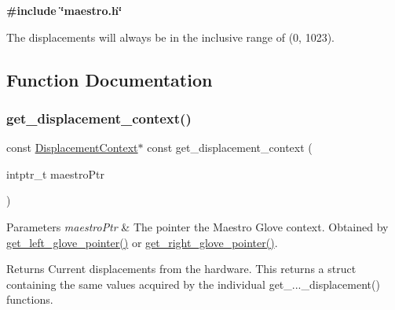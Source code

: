 {\bfseries {\ttfamily \#include \char`\"{}maestro.\+h\char`\"{}}}

The displacements will always be in the inclusive range of (0, 1023). 

\subsection{Function Documentation}
\mbox{\label{group__displacement_access_ga26563f1c104bd9a0d80ab8c0afd1e8bd}} 
\subsubsection{\texorpdfstring{get\+\_\+displacement\+\_\+context()}{get\_displacement\_context()}}
{\footnotesize\ttfamily const \hyperlink{struct_displacement_context}{Displacement\+Context}$\ast$ const get\+\_\+displacement\+\_\+context (\begin{DoxyParamCaption}\item[{intptr\+\_\+t}]{maestro\+Ptr }\end{DoxyParamCaption})}


\begin{DoxyParams}{Parameters}
{\em maestro\+Ptr} & The pointer the Maestro Glove context. Obtained by \hyperlink{group__glove_management_ga63ce3c99d4a8b8db851b22af9185764e}{get\+\_\+left\+\_\+glove\+\_\+pointer()} or \hyperlink{group__glove_management_ga9b8fd9d91aeac3f8da50f7a7eba0c32b}{get\+\_\+right\+\_\+glove\+\_\+pointer()}. \\
\hline
\end{DoxyParams}
\begin{DoxyReturn}{Returns}
Current displacements from the hardware. This returns a struct containing the same values acquired by the individual {\ttfamily get\+\_\+...\+\_\+displacement()} functions. 
\end{DoxyReturn}
\mbox{\label{group__displacement_access_gaa1bfb69dab314ccf7e6dc1df6d3657bc}} 
